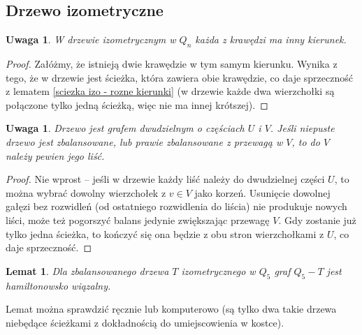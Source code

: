 \documentclass{pracamgr}
\newtheorem{lemma}[theorem]{Lemat}
\newtheorem{remark}[theorem]{Uwaga}
\begin{document}
   \subsection{Drzewo izometryczne}
    \begin{remark}\label{drzewo izo - kierunek tylko raz}
     W drzewie izometrycznym w $Q_n$ każda z krawędzi ma inny kierunek.
    \end{remark}
    \begin{proof}
     Załóżmy, że istnieją dwie krawędzie w tym samym kierunku. Wynika z tego, że w drzewie jest ścieżka,
     która zawiera obie krawędzie, co daje sprzeczność z lematem
     \ref{sciezka izo - rozne kierunki} (w drzewie każde dwa wierzchołki są połączone tylko jedną ścieżką, więc nie ma innej krótszej).
    \end{proof}
    \begin{remark}\label{drzewo izo zbal - ma liść z V}
     Drzewo jest grafem dwudzielnym o częściach $U$ i $V$. Jeśli niepuste drzewo jest zbalansowane, lub prawie zbalansowane z przewagą w $V$,
     to do $V$ należy pewien jego liść.
    \end{remark}
    \begin{proof}
     Nie wprost -- jeśli w drzewie każdy liść należy do dwudzielnej części $U$, to można wybrać dowolny wierzchołek z $v\in V$ jako korzeń.
     Usunięcie dowolnej gałęzi bez rozwidleń (od ostatniego rozwidlenia do liścia) nie produkuje nowych liści, może też pogorszyć balans jedynie
     zwiększając przewagę $V$. Gdy zostanie już tylko jedna ścieżka, to kończyć się ona będzie z obu stron wierzchołkami z $U$, co daje sprzeczność.
    \end{proof}
    \begin{lemma}\label{Q_5-izo tree hamilton}
     Dla zbalansowanego drzewa $T$ izometrycznego w $Q_5$ graf $Q_5-T$ jest hamiltonowsko wiązalny.
    \end{lemma}
    Lemat można sprawdzić ręcznie lub komputerowo (są tylko dwa takie drzewa niebędące ścieżkami z dokładnością do umiejscowienia w kostce).
\end{document}

